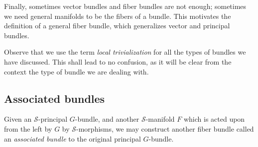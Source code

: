 Finally, sometimes vector bundles and fiber bundles are not enough; sometimes we need general manifolds to be the fibers of a bundle. This motivates the definition of a general fiber bundle, which generalizes vector and principal bundles.


Observe that we use the term \textit{local trivialization} for all the types of bundles we have discussed. This shall lead to no confusion, as it will be clear from the context the type of bundle we are dealing with. 

\subsection{Associated bundles} \label{section_associated_bundles}
Given an \(\mathcal{S}\)-principal \(G\)-bundle, and another \(\mathcal{S}\)-manifold \(F\) which is acted upon from the left by \(G\) by \(\mathcal{S}\)-morphisms, we may construct another fiber bundle called an \textit{associated bundle} to the original principal \(G\)-bundle.  

